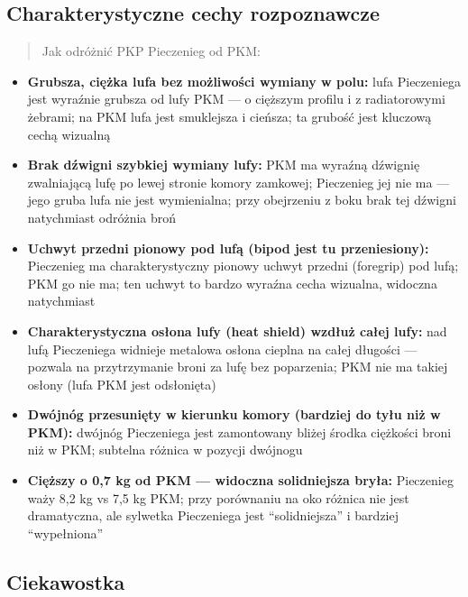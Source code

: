 \documentclass[12pt,oneside]{book}
\providecommand{\tightlist}{%
  \setlength{\itemsep}{0pt}\setlength{\parskip}{0pt}}
\begin{document}
\subsection{Charakterystyczne cechy
rozpoznawcze}\label{charakterystyczne-cechy-rozpoznawcze-72}

\begin{quote}
Jak odróżnić PKP Pieczenieg od PKM:
\end{quote}

\begin{itemize}
\tightlist
\item
  \textbf{Grubsza, ciężka lufa bez możliwości wymiany w polu:} lufa
  Pieczeniega jest wyraźnie grubsza od lufy PKM --- o cięższym profilu i
  z radiatorowymi żebrami; na PKM lufa jest smuklejsza i cieńsza; ta
  grubość jest kluczową cechą wizualną
\item
  \textbf{Brak dźwigni szybkiej wymiany lufy:} PKM ma wyraźną dźwignię
  zwalniającą lufę po lewej stronie komory zamkowej; Pieczenieg jej nie
  ma --- jego gruba lufa nie jest wymienialna; przy obejrzeniu z boku
  brak tej dźwigni natychmiast odróżnia broń
\item
  \textbf{Uchwyt przedni pionowy pod lufą (bipod jest tu przeniesiony):}
  Pieczenieg ma charakterystyczny pionowy uchwyt przedni (foregrip) pod
  lufą; PKM go nie ma; ten uchwyt to bardzo wyraźna cecha wizualna,
  widoczna natychmiast
\item
  \textbf{Charakterystyczna osłona lufy (heat shield) wzdłuż całej
  lufy:} nad lufą Pieczeniega widnieje metalowa osłona cieplna na całej
  długości --- pozwala na przytrzymanie broni za lufę bez poparzenia;
  PKM nie ma takiej osłony (lufa PKM jest odsłonięta)
\item
  \textbf{Dwójnóg przesunięty w kierunku komory (bardziej do tyłu niż w
  PKM):} dwójnóg Pieczeniega jest zamontowany bliżej środka ciężkości
  broni niż w PKM; subtelna różnica w pozycji dwójnogu
\item
  \textbf{Cięższy o 0,7 kg od PKM --- widoczna solidniejsza bryła:}
  Pieczenieg waży 8,2 kg vs 7,5 kg PKM; przy porównaniu na oko różnica
  nie jest dramatyczna, ale sylwetka Pieczeniega jest ``solidniejsza'' i
  bardziej ``wypełniona''
\end{itemize}

\subsection{Ciekawostka}\label{ciekawostka-72}
\end{document}

